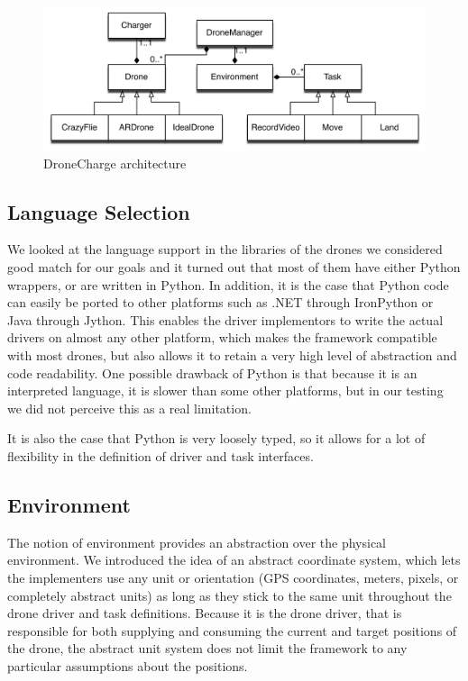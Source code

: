 \begin{figure}[h]
\centering
\includegraphics[width=\columnwidth]{images/dronechargearchitecture.png}
\caption{DroneCharge architecture}
\label{fig:architecturefig}
\end{figure}

\subsection{Language Selection}
We looked at the language support in the libraries of the drones we considered good match for our goals and it turned out that most of them have either Python wrappers, or are written in Python. In addition, it is the case that Python code can easily be ported to other platforms such as .NET through IronPython or Java through Jython. This enables the driver implementors to write the actual drivers on almost any other platform, which makes the framework compatible with most drones, but also allows it to retain a very high level of abstraction and code readability. One possible drawback of Python is that because it is an interpreted language, it is slower than some other platforms, but in our testing we did not perceive this as a real limitation. 

It is also the case that Python is very loosely typed, so it allows for a lot of flexibility in the definition of driver and task interfaces.

\subsection{Environment}
The notion of environment provides an abstraction over the physical environment. We introduced the idea of an abstract coordinate system, which lets the implementers use any unit or orientation (GPS coordinates, meters, pixels, or completely abstract units) as long as they stick to the same unit throughout the drone driver and task definitions. Because it is the drone driver, that is responsible for both supplying and consuming the current and target positions of the drone, the abstract unit system does not limit the framework to any particular assumptions about the positions.

